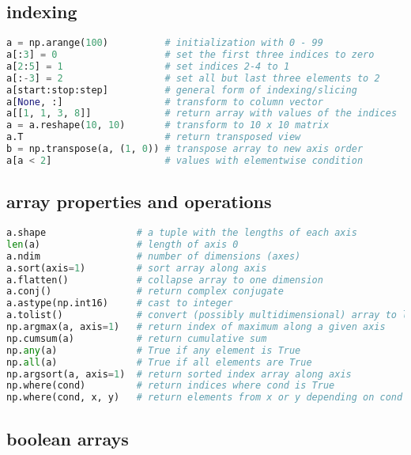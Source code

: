 \subsection{indexing}\label{indexing}

\begin{lstlisting}[language=Python]
a = np.arange(100)          # initialization with 0 - 99
a[:3] = 0                   # set the first three indices to zero
a[2:5] = 1                  # set indices 2-4 to 1
a[:-3] = 2                  # set all but last three elements to 2
a[start:stop:step]          # general form of indexing/slicing
a[None, :]                  # transform to column vector
a[[1, 1, 3, 8]]             # return array with values of the indices
a = a.reshape(10, 10)       # transform to 10 x 10 matrix
a.T                         # return transposed view
b = np.transpose(a, (1, 0)) # transpose array to new axis order
a[a < 2]                    # values with elementwise condition
\end{lstlisting}

\subsection{array properties and
operations}\label{array-properties-and-operations}

\begin{lstlisting}[language=Python]
a.shape                # a tuple with the lengths of each axis
len(a)                 # length of axis 0
a.ndim                 # number of dimensions (axes)
a.sort(axis=1)         # sort array along axis
a.flatten()            # collapse array to one dimension
a.conj()               # return complex conjugate
a.astype(np.int16)     # cast to integer
a.tolist()             # convert (possibly multidimensional) array to list
np.argmax(a, axis=1)   # return index of maximum along a given axis
np.cumsum(a)           # return cumulative sum
np.any(a)              # True if any element is True
np.all(a)              # True if all elements are True
np.argsort(a, axis=1)  # return sorted index array along axis
np.where(cond)         # return indices where cond is True
np.where(cond, x, y)   # return elements from x or y depending on cond
\end{lstlisting}

\subsection{boolean arrays}\label{boolean-arrays}


